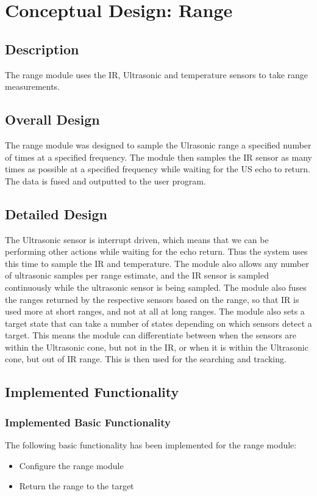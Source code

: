 \documentclass[]{report}
\begin{document}
\section{Conceptual Design: Range}
\subsection{Description}
The range module uses the IR, Ultrasonic and temperature sensors to take range measurements.

\subsection{Overall Design}
The range module was designed to sample the Ulrasonic range a specified number of times at a specified frequency. The module then samples the IR sensor as many times as possible at a specified frequency while waiting for the US echo to return. The data is fused and outputted to the user program.

\subsection{Detailed Design}
The Ultrasonic sensor is interrupt driven, which means that we can be performing other actions while waiting for the echo return. Thus the system uses this time to sample the IR and temperature. The module also allows any number of ultrasonic samples per range estimate, and the IR sensor is sampled continuously while the ultrasonic sensor is being sampled. The module also fuses the ranges returned by the respective sensors based on the range, so that IR is used more at short ranges, and not at all at long ranges. The module also sets a target state that can take a number of states depending on which sensors detect a target. This means the module can differentiate between when the sensors are within the Ultrasonic cone, but not in the IR, or when it is within the Ultrasonic cone, but out of IR range. This is then used for the searching and tracking.

\subsection{Implemented Functionality}
\subsubsection{Implemented Basic Functionality}
The following basic functionality has been implemented for the range module:
\begin{itemize}
	\item Configure the range module
	\item Return the range to the target
\end{itemize}
\end{document}
